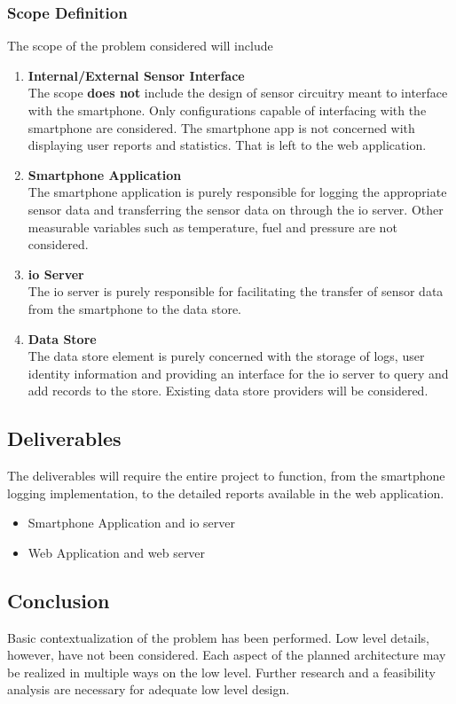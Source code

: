 \subsubsection{Scope Definition}
The scope of the problem considered will include
\begin{enumerate}
\item \textbf{Internal/External Sensor Interface}\\
The scope \textbf{does not} include the design of sensor circuitry meant to interface with the smartphone. Only configurations capable of interfacing with the smartphone are considered.
The smartphone app is not concerned with displaying user reports and statistics. That is left to the web application.
\item \textbf{Smartphone Application}\\
The smartphone application is purely responsible for logging the appropriate sensor data and transferring the sensor data on through the \ac{io} server.
Other measurable variables such as temperature, fuel and pressure are not considered.
\item \textbf{\ac{io} Server}\\
The \ac{io} server is purely responsible for facilitating the transfer of sensor data from the smartphone to the data store.
\item \textbf{Data Store}\\
    The data store element is purely concerned with the storage of logs, user identity information and providing an interface for the \ac{io} server to query and add records to the store.
    Existing data store providers will be considered.
\end{enumerate}

\subsection{Deliverables}
The deliverables will require the entire project to function, from the smartphone logging implementation, to the detailed reports available in the web application. 
\begin{itemize}
\item Smartphone Application and \ac{io} server
\item Web Application and web server
\end{itemize}

\subsection{Conclusion}
Basic contextualization of the problem has been performed.
Low level details, however, have not been considered.
Each aspect of the planned architecture may be realized in multiple ways on the low level.
Further research and a feasibility analysis are necessary for adequate low level design.

\pagebreak
